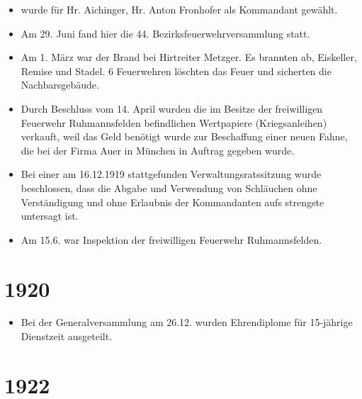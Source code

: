 \documentclass[12pt,a4paper]{book}
\begin{document}
\begin{itemize}
\item wurde für Hr. Aichinger, Hr. Anton Fronhofer als Kommandant gewählt.

\item Am 29. Juni fand hier die 44. Bezirksfeuerwehrversammlung statt.

\item Am 1. März war der Brand bei Hirtreiter Metzger. Es brannten ab,
Eiskeller, Remise und Stadel. 6 Feuerwehren löschten das Feuer und sicherten die
Nachbarsgebäude.

\item Durch Beschluss vom 14. April wurden die im Besitze der freiwilligen
Feuerwehr Ruhmannsfelden befindlichen Wertpapiere (Kriegsanleihen) verkauft,
weil das Geld benötigt wurde zur Beschaffung einer neuen Fahne, die bei der
Firma Auer in München in Auftrag gegeben wurde.

\item Bei einer am 16.12.1919 stattgefunden Verwaltungsratssitzung wurde
beschlossen, dass die Abgabe und Verwendung von Schläuchen ohne Verständigung
und ohne Erlaubnis der Kommandanten aufs strengste untersagt ist.

\item Am 15.6. war Inspektion der freiwilligen Feuerwehr Ruhmannsfelden.
\end{itemize}

\section*{1920}

\begin{itemize}
\item Bei der Generalversammlung am 26.12. wurden Ehrendiplome für 15-jährige
Dienstzeit ausgeteilt.
\end{itemize}

\section*{1922}
\end{document}
